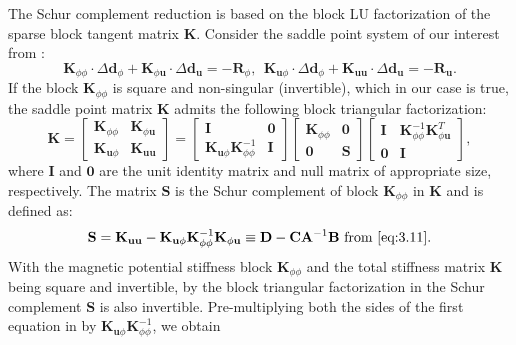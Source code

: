 \documentclass[11pt,a4paper,final]{article}
\begin{document}
The Schur complement reduction is based on the block LU factorization of the sparse block tangent matrix $\mathbf{K}$. Consider the saddle point system of our interest  from :
\begin{equation}
\mathbf{K}_{\phi \phi} \cdot \Delta \mathbf{d}_{\phi} + \mathbf{K}_{\phi \mathbf{u}} \cdot \Delta \mathbf{d}_{\mathbf{u}} = -\mathbf{R}_{\phi}, \ \ \mathbf{K}_{\mathbf{u} \phi} \cdot \Delta \mathbf{d}_{\phi} + \mathbf{K}_{\mathbf{u} \mathbf{u}} \cdot \Delta \mathbf{d}_{\mathbf{u}} = -\mathbf{R}_{\mathbf{u}}. 
\label{eq:3.16}
\end{equation}
If the block $\mathbf{K}_{\phi \phi}$ is square and non-singular (invertible), which in our case is true, the saddle point matrix $\mathbf{K}$ admits the following block triangular factorization:
\begin{equation}
\mathbf{K} = 
\begin{bmatrix}
\mathbf{K}_{\phi \phi} & \mathbf{K}_{\phi \mathbf{u}} \\
\mathbf{K}_{\mathbf{u} \phi} & \mathbf{K}_{\mathbf{u} \mathbf{u}}
\end{bmatrix} 
= 
\begin{bmatrix}
\mathbf{I} & \mathbf{0} \\
\mathbf{K}_{\mathbf{u} \phi} \mathbf{K}_{\phi \phi}^{-1} & \mathbf{I}
\end{bmatrix}
\begin{bmatrix}
\mathbf{K}_{\phi \phi} & \mathbf{0} \\
\mathbf{0} & \mathbf{S}
\end{bmatrix}
\begin{bmatrix}
\mathbf{I} & \mathbf{K}_{\phi \phi}^{-1} \mathbf{K}_{\phi \mathbf{u}}^T \\
\mathbf{0} & \mathbf{I}
\end{bmatrix},
\label{eq:3.17}
\end{equation} 
where $\mathbf{I}$  and $\mathbf{0}$ are the unit identity matrix and null matrix of appropriate size, respectively. The matrix $\mathbf{S}$ is the Schur complement of block $\mathbf{K}_{\phi \phi}$ in $\mathbf{K}$ and is defined as:
\begin{equation}
\mathbf{S} = \mathbf{K}_{\mathbf{u} \mathbf{u}} - \mathbf{K}_{\mathbf{u} \phi} \mathbf{K}_{\phi \phi}^{-1} \mathbf{K}_{\phi \mathbf{u}} \equiv \mathbf{D} - \mathbf{C} \mathbf{A}^{-1} \mathbf{B} \ \text{from \Cref{eq:3.11}}.
\label{eq:3.18}
\end{equation}
With the magnetic potential stiffness block $\mathbf{K}_{\phi \phi}$ and the total stiffness matrix $\mathbf{K}$ being square and invertible, by the block triangular factorization in  the Schur complement $\mathbf{S}$ is also invertible. Pre-multiplying both the sides of the first equation in  by $\mathbf{K}_{\mathbf{u} \phi} \mathbf{K}_{\phi \phi}^{-1}$, we obtain
\end{document}
